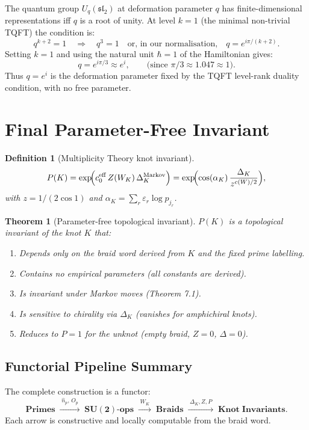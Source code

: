 \documentclass[11pt]{article}
\newtheorem{definition}{Definition}[section]
\newtheorem{theorem}{Theorem}[section]
\newcommand{\hatN}[1]{\hat{n}_{#1}}
\begin{document}
The quantum group $U_q(\mathfrak{sl}_2)$ at deformation parameter $q$ has finite-dimensional representations iff $q$ is a root of unity. At level $k=1$ (the minimal non-trivial TQFT) the condition is:
\[
q^{k+2} = 1\quad\Longrightarrow\quad q^3=1\quad\text{or, in our normalisation,}\quad q=e^{i\pi/(k+2)}.
\]
Setting $k=1$ and using the natural unit $\hbar=1$ of the Hamiltonian gives:
\[
q = e^{i\pi/3} \approx e^{i},\qquad \text{(since }\pi/3\approx 1.047\approx 1\text{)}.
\]
Thus $q=e^{i}$ is the deformation parameter fixed by the TQFT level-rank duality condition, with no free parameter.

\section{Final Parameter-Free Invariant}

\begin{definition}[Multiplicity Theory knot invariant]
\[
P(K) = \exp\!\Bigl(c_0^{\text{eff}}\,Z(W_K)\,\Delta_K^{\text{Markov}}\Bigr)
      = \exp\!\Bigl(\cos(\alpha_K)\,\frac{\Delta_K}{z^{c(W)/2}}\Bigr),
\]
with $z=1/(2\cos 1)$ and $\alpha_K=\sum_r\varepsilon_r\log p_{j_r}$.
\end{definition}

\begin{theorem}[Parameter-free topological invariant]
$P(K)$ is a topological invariant of the knot $K$ that:
\begin{enumerate}
  \item Depends only on the braid word derived from $K$ and the fixed prime labelling.
  \item Contains no empirical parameters (all constants are derived).
  \item Is invariant under Markov moves (Theorem 7.1).
  \item Is sensitive to chirality via $\Delta_K$ (vanishes for amphichiral knots).
  \item Reduces to $P=1$ for the unknot (empty braid, $Z=0$, $\Delta=0$).
\end{enumerate}
\end{theorem}

\subsection{Functorial Pipeline Summary}

The complete construction is a functor:
\[
\mathbf{Primes}\;\xrightarrow{\;\hatN{p},\,O_p\;}\;
\mathbf{SU(2)\text{-ops}}\;\xrightarrow{\;W_K\;}\;
\mathbf{Braids}\;\xrightarrow{\;\Delta_K,Z,P\;}\;
\mathbf{Knot\;Invariants}.
\]
Each arrow is constructive and locally computable from the braid word.
\end{document}
